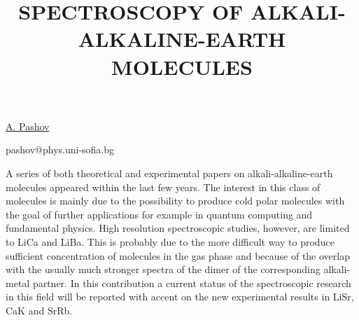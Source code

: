 \title{SPECTROSCOPY OF ALKALI-ALKALINE-EARTH MOLECULES}

\underline{A. Pashov} 

{\normalsize{\vspace{-4mm}
\unisofia

\email pashov@phys.uni-sofia.bg}}

A series of both theoretical and experimental papers on alkali-alkaline-earth molecules appeared within the last few years. The interest in this class of molecules is mainly due to the
possibility to produce cold polar molecules with the goal of further applications for example in quantum computing and fundamental physics. High resolution spectroscopic studies,
however, are limited to LiCa  and LiBa. This is probably due to the more difficult way to produce sufficient concentration of molecules in the gas phase and because of the overlap with
the usually much stronger spectra of the dimer of the corresponding alkali-metal partner. In this contribution a current status of the spectroscopic research in this field will be reported
with accent on the new experimental results in LiSr, CaK and SrRb.

\vspace{\baselineskip}
